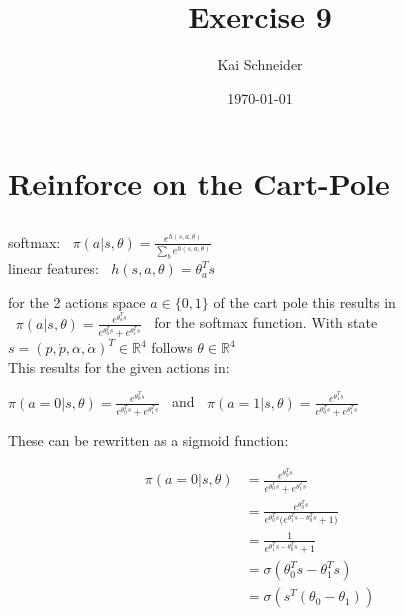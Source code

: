 \documentclass[11pt,a4paper]{article}
\title{Exercise 9}
\author{Kai Schneider}
\date{\today}
\begin{document}
 

\maketitle

\section{Reinforce on the Cart-Pole}

\subsection{}

softmax: $\;\; \pi(a|s,\theta) = \frac{e^{h(s,a,\theta)}}{\sum_{b}e^{h(s,a,\theta)}}$ \\

\flushleft
linear features: $\;\; h(s,a,\theta) = \theta_{a}^{T}s$ \\

\vspace{10pt}

for the 2 actions space $a\in\{0, 1\}$ of the cart pole this results in  
$\;\; \pi(a|s,\theta) = \frac{e^{\theta_{a}^{T}s}}{e^{\theta_{0}^{T}s} + e^{\theta_{1}^{T}s}} \;\;$ for the softmax function.
With state $s=(p, \dot{p}, \alpha, \dot{\alpha})^{T}\in\mathbb{R}^4$ follows $\theta\in\mathbb{R}^4$ \\

This results for the given actions in: 

\vspace{5pt}

\begin{center}
$\pi(a=0|s,\theta) = \frac{e^{\theta_{0}^{T}s}}{e^{\theta_{0}^{T}s} + e^{\theta_{1}^{T}s}} \;\;$ and 
$\;\; \pi(a=1|s,\theta) = \frac{e^{\theta_{1}^{T}s}}{e^{\theta_{0}^{T}s} + e^{\theta_{1}^{T}s}}$
\end{center}

\vspace{5pt}

These can be rewritten as a sigmoid function:

\begin{align*}
\pi(a=0|s,\theta) &= \frac{e^{\theta_{0}^{T}s}} {e^{\theta_{0}^{T}s} + e^{\theta_{1}^{T}s}} \\
                  &= \frac{e^{\theta_{0}^{T}s}} {e^{\theta_{0}^{T}s} \bigl( e^{\theta_{1}^{T}s - \theta_{0}^{T}s} + 1 \bigr)} \\
                  &=  \frac{1} {e^{\theta_{1}^{T}s - \theta_{0}^{T}s} + 1} \\
                  &=  \sigma(\theta_{0}^{T}s - \theta_{1}^{T}s) \\
                  &=  \sigma(s^{T}(\theta_{0} - \theta_{1}))
\end{align*}
\end{document}
